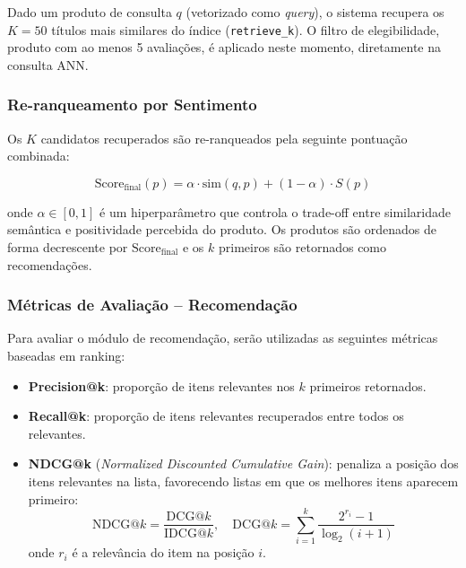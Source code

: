 \documentclass{IEEEtran}
\begin{document}
Dado um produto de consulta $q$ (vetorizado como \textit{query}), o sistema
recupera os $K=50$ títulos mais similares do índice (\texttt{retrieve\_k}). O
filtro de elegibilidade, produto com ao menos 5 avaliações, é aplicado neste momento, diretamente na consulta ANN. 

\subsubsection{Re-ranqueamento por Sentimento}
\label{subsubsec:reranking}

Os $K$ candidatos recuperados são re-ranqueados pela seguinte pontuação combinada:

\begin{equation}
  \text{Score}_{\text{final}}(p) = \alpha \cdot \text{sim}(q, p) + (1 - \alpha) \cdot S(p)
  \label{eq:reranking}
\end{equation}

onde $\alpha \in [0, 1]$ é um hiperparâmetro que controla o trade-off entre similaridade semântica e positividade percebida do produto. Os produtos são ordenados de forma decrescente por $\text{Score}_{\text{final}}$ e os $k$ primeiros são retornados como recomendações.

\subsubsection{Métricas de Avaliação -- Recomendação}
\label{subsubsec:metrics_recomendation}

Para avaliar o módulo de recomendação, serão utilizadas as seguintes métricas baseadas em ranking:

\begin{itemize}[noitemsep]
  \item \textbf{Precision@k}: proporção de itens relevantes nos $k$ primeiros retornados.
  \item \textbf{Recall@k}: proporção de itens relevantes recuperados entre todos os relevantes.
  \item \textbf{NDCG@k} (\textit{Normalized Discounted Cumulative Gain}): penaliza a posição dos itens relevantes na lista, favorecendo listas em que os melhores itens aparecem primeiro:
    \begin{equation}
      \text{NDCG}@k = \frac{\text{DCG}@k}{\text{IDCG}@k}, \quad \text{DCG}@k = \sum_{i=1}^{k} \frac{2^{r_i}-1}{\log_2(i+1)}
      \label{eq:ndcg}
    \end{equation}
    onde $r_i$ é a relevância do item na posição $i$.
\end{itemize}
\end{document}
